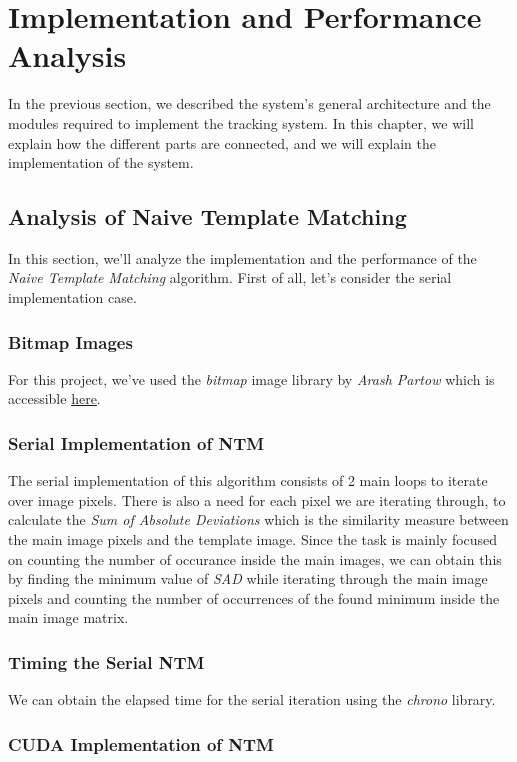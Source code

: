 \chapter{Implementation and Performance Analysis}
In the previous section, we described the system's general architecture and the modules required to implement the tracking system. In this chapter, we will explain how the different parts are connected, and we will explain the implementation of the system.
\section{Analysis of Naive Template Matching}
In this section, we'll analyze the implementation and the performance of the \textit{Naive Template Matching} algorithm. First of all, let's consider the serial implementation case. 

\subsection{Bitmap Images}
For this project, we've used the \textit{bitmap} image library by \textit{Arash Partow} which is accessible \href{https://github.com/ArashPartow/bitmap}{here}.

\subsection{Serial Implementation of NTM}
The serial implementation of this algorithm consists of 2 main loops to iterate over image pixels. There is also a need for each pixel we are iterating through, to calculate the \textit{Sum of Absolute Deviations} which is the similarity measure between the main image pixels and the template image. Since the task is mainly focused on counting the number of occurance inside the main images, we can obtain this by finding the minimum value of \textit{SAD} while iterating through the main image pixels and counting the number of occurrences of the found minimum inside the main image matrix.

\subsection{Timing the Serial NTM}
We can obtain the elapsed time for the serial iteration using the \textit{chrono} library.

\subsection{CUDA Implementation of NTM}
